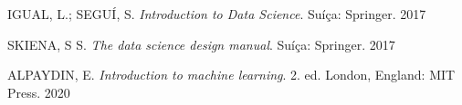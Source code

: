 


\begin{thebibliography}{}


{IGUAL, L.; SEGU{\' I}, S. \emph{Introduction to Data Science}. Su{\' i}{\c c}a: Springer. 2017}

{SKIENA, S S. \emph{The data science design manual}. Su{\' i}{\c c}a: Springer. 2017}

{ALPAYDIN, E. \emph{Introduction to machine learning}.
2. ed. London, England: MIT Press. 2020}


\end{thebibliography}
